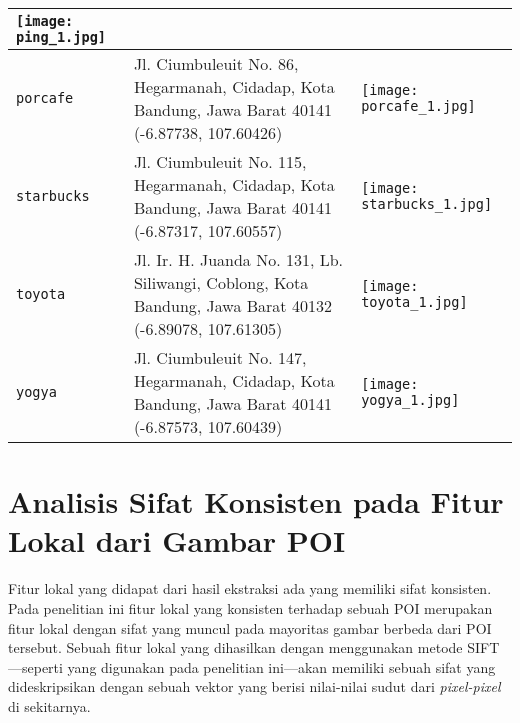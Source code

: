 \begin{longtable}{|p{}|p{}|p{}|}
\begin{minipage}{.4\textwidth}
		\vspace{5pt} \texttt{[image: ping\_1.jpg]}
	\end{minipage} \\
	\hline
	\texttt{porcafe} & Jl. Ciumbuleuit No. 86, Hegarmanah, Cidadap, Kota Bandung, Jawa Barat 40141 (-6.87738, 107.60426) & \begin{minipage}{.4\textwidth}
		\vspace{5pt} \texttt{[image: porcafe\_1.jpg]}
	\end{minipage} \\
	\hline
	\texttt{starbucks} & Jl. Ciumbuleuit No. 115, Hegarmanah, Cidadap, Kota Bandung, Jawa Barat 40141 (-6.87317, 107.60557) & \begin{minipage}{.4\textwidth}
		\vspace{5pt} \texttt{[image: starbucks\_1.jpg]}
	\end{minipage} \\
	\hline
	\texttt{toyota} & Jl. Ir. H. Juanda No. 131, Lb. Siliwangi, Coblong, Kota Bandung, Jawa Barat 40132 (-6.89078, 107.61305) & \begin{minipage}{.4\textwidth}
		\vspace{5pt} \texttt{[image: toyota\_1.jpg]}
	\end{minipage} \\
	\hline
	\texttt{yogya} & Jl. Ciumbuleuit No. 147, Hegarmanah, Cidadap, Kota Bandung, Jawa Barat 40141 (-6.87573, 107.60439) & \begin{minipage}{.4\textwidth}
		\vspace{5pt} \texttt{[image: yogya\_1.jpg]}
	\end{minipage} \\
	\hline
\end{longtable}


\section{Analisis Sifat Konsisten pada Fitur Lokal dari Gambar POI}
\label{sec:analisis_konsistensi}
Fitur lokal yang didapat dari hasil ekstraksi ada yang memiliki sifat konsisten. Pada penelitian ini fitur lokal yang konsisten terhadap sebuah POI merupakan fitur lokal dengan sifat yang muncul pada mayoritas gambar berbeda dari POI tersebut. Sebuah fitur lokal yang dihasilkan dengan menggunakan metode SIFT ---seperti yang digunakan pada penelitian ini---akan memiliki sebuah sifat yang dideskripsikan dengan sebuah vektor yang berisi nilai-nilai sudut dari \textit{pixel-pixel} di sekitarnya. 

